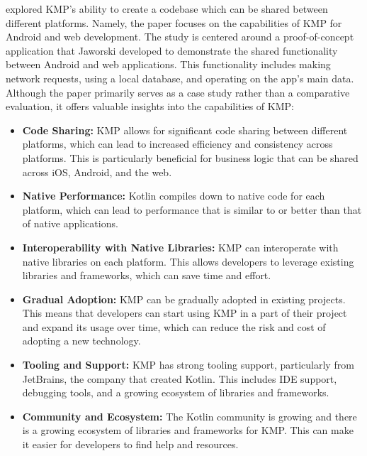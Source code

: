 \cite{Jaworski.2021} explored KMP's ability to create a codebase which can be shared between different platforms.  Namely, the paper focuses on the capabilities of KMP for Android and web development.  The study is centered around a proof-of-concept application that Jaworski developed to demonstrate the shared functionality between Android and web applications. This functionality includes making network requests, using a local database, and operating on the app's main data. Although the paper primarily serves as a case study rather than a comparative evaluation, it offers valuable insights into the capabilities of KMP: 
\begin{itemize}
    \item \textbf{Code Sharing:} KMP allows for significant code sharing between different platforms, which can lead to increased efficiency and consistency across platforms. This is particularly beneficial for business logic that can be shared across iOS, Android, and the web.
    
    \item \textbf{Native Performance:} Kotlin compiles down to native code for each platform, which can lead to performance that is similar to or better than that of native applications.
    
    \item \textbf{Interoperability with Native Libraries:} KMP can interoperate with native libraries on each platform. This allows developers to leverage existing libraries and frameworks, which can save time and effort.

    \item \textbf{Gradual Adoption:} KMP can be gradually adopted in existing projects. This means that developers can start using KMP in a part of their project and expand its usage over time, which can reduce the risk and cost of adopting a new technology.

    \item \textbf{Tooling and Support:} KMP has strong tooling support, particularly from JetBrains, the company that created Kotlin. This includes IDE support, debugging tools, and a growing ecosystem of libraries and frameworks.

    \item \textbf{Community and Ecosystem:} The Kotlin community is growing and there is a growing ecosystem of libraries and frameworks for KMP. This can make it easier for developers to find help and resources.
\end{itemize}
